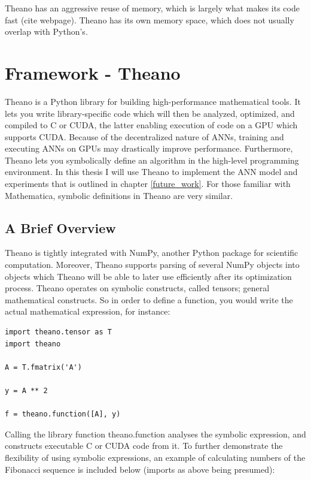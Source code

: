 Theano has an aggressive reuse of memory, which is largely what makes its code fast (cite webpage). Theano has its own memory space, which does not usually overlap with Python's.


\section{Framework - Theano}

Theano is a Python library for building high-performance mathematical tools. It lets you write library-specific code which will then be analyzed, optimized, and compiled to C or CUDA, the latter enabling execution of code on a GPU which supports CUDA. Because of the decentralized nature of ANNs, training and executing ANNs on GPUs may drastically improve performance. Furthermore, Theano lets you symbolically define an algorithm in the high-level programming environment. In this thesis I will use Theano to implement the ANN model and experiments that is outlined in chapter \ref{future_work}. For those familiar with Mathematica, symbolic definitions in Theano are very similar.

\subsection{A Brief Overview}

Theano is tightly integrated with NumPy, another Python package for scientific computation. Moreover, Theano supports parsing of several NumPy objects into objects which Theano will be able to later use efficiently after its optimization process.
Theano operates on symbolic constructs, called tensors; general mathematical constructs. So in order to define a function, you would write the actual mathematical expression, for instance:

\begin{verbatim}
import theano.tensor as T
import theano

A = T.fmatrix('A')

y = A ** 2

f = theano.function([A], y)
\end{verbatim}

Calling the library function theano.function analyses the symbolic expression, and constructs executable C or CUDA code from it. To further demonstrate the flexibility of using symbolic expressions, an example of calculating numbers of the Fibonacci sequence is included below (imports as above being presumed):

